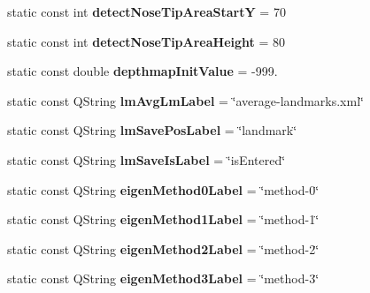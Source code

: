 \begin{DoxyCompactItemize}
\item 
\hypertarget{class_common_a9cb59248a423dc56c8bde860912f30db}{static const int {\bfseries detect\+Nose\+Tip\+Area\+Start\+Y} = 70}\label{class_common_a9cb59248a423dc56c8bde860912f30db}

\item 
\hypertarget{class_common_aaefc54199f8b6426d0b38f01de1915d2}{static const int {\bfseries detect\+Nose\+Tip\+Area\+Height} = 80}\label{class_common_aaefc54199f8b6426d0b38f01de1915d2}

\item 
\hypertarget{class_common_a054b047e34163f331007f05c698e4b06}{static const double {\bfseries depthmap\+Init\+Value} = -\/999.}\label{class_common_a054b047e34163f331007f05c698e4b06}

\item 
\hypertarget{class_common_a15e4b83b39bf46f9e8d12d25e59dbcfa}{static const Q\+String {\bfseries lm\+Avg\+Lm\+Label} = \char`\"{}average-\/landmarks.\+xml\char`\"{}}\label{class_common_a15e4b83b39bf46f9e8d12d25e59dbcfa}

\item 
\hypertarget{class_common_aecbbdccb6a0a0765e4216661209fae84}{static const Q\+String {\bfseries lm\+Save\+Pos\+Label} = \char`\"{}landmark\char`\"{}}\label{class_common_aecbbdccb6a0a0765e4216661209fae84}

\item 
\hypertarget{class_common_ac077acad57cef0aa3b43b533ddd6a9c1}{static const Q\+String {\bfseries lm\+Save\+Is\+Label} = \char`\"{}is\+Entered\char`\"{}}\label{class_common_ac077acad57cef0aa3b43b533ddd6a9c1}

\item 
\hypertarget{class_common_aa3247ca204c94690f4b8e0bc5a8e3010}{static const Q\+String {\bfseries eigen\+Method0\+Label} = \char`\"{}method-\/0\char`\"{}}\label{class_common_aa3247ca204c94690f4b8e0bc5a8e3010}

\item 
\hypertarget{class_common_a669c14bb2e388d7c994ae101b2ba1133}{static const Q\+String {\bfseries eigen\+Method1\+Label} = \char`\"{}method-\/1\char`\"{}}\label{class_common_a669c14bb2e388d7c994ae101b2ba1133}

\item 
\hypertarget{class_common_a0285ae319cb4e4da983283bc8c741eae}{static const Q\+String {\bfseries eigen\+Method2\+Label} = \char`\"{}method-\/2\char`\"{}}\label{class_common_a0285ae319cb4e4da983283bc8c741eae}

\item 
\hypertarget{class_common_ae6fa4d97e5353aa35fc55542ebecc85c}{static const Q\+String {\bfseries eigen\+Method3\+Label} = \char`\"{}method-\/3\char`\"{}}\label{class_common_ae6fa4d97e5353aa35fc55542ebecc85c}


\end{DoxyCompactItemize}
